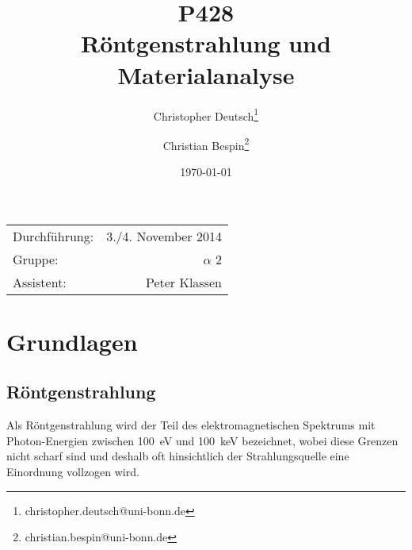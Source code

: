 \documentclass[10pt, a4paper]{article}
\title{P428 \\ Röntgenstrahlung und Materialanalyse}
\author{Christopher Deutsch\footnote{christopher.deutsch@uni-bonn.de} \and Christian Bespin\footnote{christian.bespin@uni-bonn.de}}
\date{\today}
\begin{document}
\maketitle

\begin{center}
\begin{tabular}{l r}
Durchführung: & 3./4. November 2014 \\
Gruppe: & $\alpha$ 2 \\
Assistent: & Peter Klassen
\end{tabular}
\end{center}

\begin{abstract}
\noindent
\end{abstract}

\tableofcontents
\newpage


\section{Grundlagen}
\subsection{Röntgenstrahlung}
Als Röntgenstrahlung wird der Teil des elektromagnetischen Spektrums mit Photon-Energien zwischen \SI{100}{\electronvolt} und \SI{100}{\kilo\electronvolt} bezeichnet, wobei diese Grenzen nicht scharf sind und deshalb oft hinsichtlich der Strahlungsquelle eine Einordnung vollzogen wird.
\end{document}
